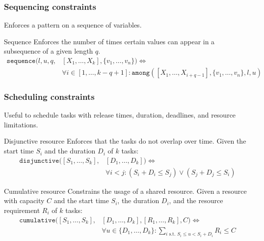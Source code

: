 \subsubsection{Sequencing constraints}
Enforces a pattern on a sequence of variables.

\begin{descriptionlist}
    \item[Sequence]
        Enforces the number of times certain values can appear in a subsequence of a given length $q$.
        \[ 
            \begin{split}
                \texttt{sequence}(l, u, q, &[X_1, \dots, X_k], \{v_1, \dots, v_n\}) \iff \\
                & \forall i \in [1, \dots, k-q+1]: \texttt{among}([X_1, \dots, X_{i+q-1}], \{v_1, \dots, v_n\}, l, u) 
            \end{split}
        \]
\end{descriptionlist}


\subsubsection{Scheduling constraints}
Useful to schedule tasks with release times, duration, deadlines, and resource limitations.

\begin{descriptionlist}
    \item[Disjunctive resource] 
        Enforces that the tasks do not overlap over time.
        Given the start time $S_i$ and the duration $D_i$ of $k$ tasks:
        \[ 
            \begin{split}
                \texttt{disjunctive}([S_1, \dots, S_k], &[D_1, \dots, D_k]) \iff \\
                & \forall i < j: (S_i + D_i \leq S_j) \vee (S_j + D_j \leq S_i)
            \end{split}
        \]

    \item[Cumulative resource] 
        Constrains the usage of a shared resource.
        Given a resource with capacity $C$ and the start time $S_i$, the duration $D_i$, and the resource requirement $R_i$ of $k$ tasks:
        \[ 
            \begin{split}
                \texttt{cumulative}([S_1, \dots, S_k], &[D_1, \dots, D_k], [R_1, \dots, R_k], C) \iff \\
                & \forall u \in \{ D_1, \dots, D_k \}: \sum_{\text{$i$ s.t. $S_i \leq u < S_i+D_i$}} R_i \leq C
            \end{split}
        \]
\end{descriptionlist}


